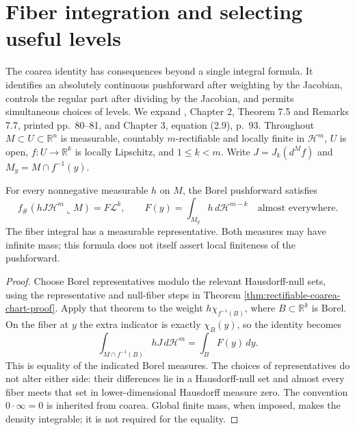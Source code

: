\chapter{Fiber integration and selecting useful levels}\label{sec:coarea-selection-disintegration}
The coarea identity has consequences beyond a single integral formula. It identifies an absolutely continuous pushforward after weighting by the Jacobian, controls the regular part after dividing by the Jacobian, and permits simultaneous choices of levels. We expand \cite{Sim18}, Chapter 2, Theorem 7.5 and Remarks 7.7, printed pp.~80--81, and Chapter 3, equation (2.9), p.~93. Throughout $M\subset U\subset\mathbb R^n$ is measurable, countably $m$-rectifiable and locally finite in $\mathcal H^m$, $U$ is open, $f:U\to\mathbb R^k$ is locally Lipschitz, and $1\leq k<m$. Write $J=J_k(d^Mf)$ and $M_y=M\cap f^{-1}(y)$.

\begin{proposition}\label{prop:coarea-weighted-pushforward}
For every nonnegative measurable $h$ on $M$, the Borel pushforward satisfies
\[
 f_\#(hJ\mathcal H^m\llcorner M)=F\mathcal L^k,
 \qquad F(y)=\int_{M_y}h\,d\mathcal H^{m-k}
 \quad\text{almost everywhere}.
\]
The fiber integral has a measurable representative. Both measures may have infinite mass; this formula does not itself assert local finiteness of the pushforward.
\end{proposition}
\begin{proof}
Choose Borel representatives modulo the relevant Hausdorff-null sets, using the representative and null-fiber steps in Theorem \ref{thm:rectifiable-coarea-chart-proof}. Apply that theorem to the weight $h\chi_{f^{-1}(B)}$, where $B\subset\mathbb R^k$ is Borel. On the fiber at $y$ the extra indicator is exactly $\chi_B(y)$, so the identity becomes
\[
 \int_{M\cap f^{-1}(B)}hJ\,d\mathcal H^m
 =\int_BF(y)\,dy.
\]
This is equality of the indicated Borel measures. The choices of representatives do not alter either side: their differences lie in a Hausdorff-null set and almost every fiber meets that set in lower-dimensional Hausdorff measure zero. The convention $0\cdot\infty=0$ is inherited from coarea. Global finite mass, when imposed, makes the density integrable; it is not required for the equality.
\end{proof}

